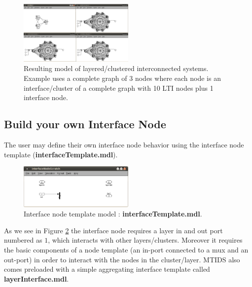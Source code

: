 \documentclass[a4paper,twoside, openright,12pt]{report}
\begin{document}
\begin{figure}[htb]
\centering
\includegraphics[width=0.5\textwidth]{pics/screenLayers.eps}
\caption[MTIDS model of layered/clustered interconnected systems]{Resulting model of layered/clustered interconnected systems. Example uses a complete graph of 3 nodes where each node is an interface/cluster of a complete graph with 10 LTI nodes plus 1 interface node.}
\label{layersFig}
\end{figure}




\subsection{Build your own Interface Node}

The user may define their own interface node behavior using the interface node template (\textbf{interfaceTemplate.mdl}). \\

\begin{figure}[htb]
\centering
\includegraphics[width=0.5\textwidth]{pics/interfaceTemplate.eps}
\caption[MTIDS interface node template]{Interface node template model : \textbf{interfaceTemplate.mdl}.}
\label{interfaceFig}
\end{figure}
 
As we see in Figure \ref{interfaceFig} the interface node requires a layer in and out port numbered as $1$, which interacts with other layers/clusters. 
Moreover it requires the basic components of a node template (an in-port connected to a mux and an out-port) in order to interact with the nodes in the cluster/layer.
MTIDS also comes preloaded with a simple aggregating interface template called \textbf{layerInterface.mdl}.
 


 
\end{document}
